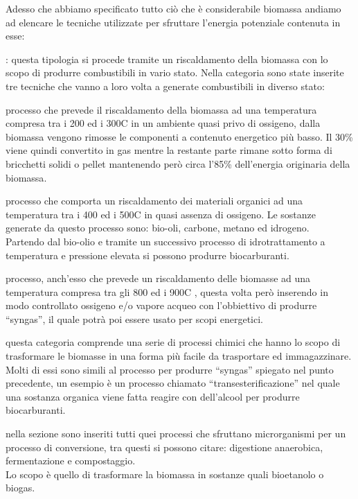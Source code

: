 \vspace{2mm}
Adesso che abbiamo specificato tutto ciò che è considerabile biomassa andiamo ad elencare le tecniche utilizzate per sfruttare l'energia potenziale contenuta in esse\cite{EIA2022}:
\begin{description}[labelindent=5mm]
    \item[$\bullet$ Conversione termica]: questa tipologia si procede tramite un riscaldamento della biomassa con lo scopo di produrre combustibili in vario stato. Nella categoria sono state inserite tre tecniche che vanno a loro volta a generate combustibili in diverso stato:
    \begin{description}[labelindent=5mm]
        \item[$\cdot$ Torrefazione:] processo che prevede il riscaldamento della biomassa ad una temperatura compresa tra i 200 ed i 300\degree C in un ambiente quasi privo di ossigeno, dalla biomassa vengono rimosse le componenti a contenuto energetico più basso. Il 30\% viene quindi convertito in gas mentre la restante parte rimane sotto forma di bricchetti solidi o pellet mantenendo però circa l'85\% dell'energia originaria della biomassa\cite{Torrification}. 
        \item[$\cdot$ Pirolisi:] processo che comporta un riscaldamento dei materiali organici ad una temperatura tra i 400 ed i 500\degree C in quasi assenza di ossigeno. Le sostanze generate da questo processo sono: bio-oli, carbone, metano ed idrogeno.\\
        Partendo dal bio-olio e tramite un successivo processo di idrotrattamento a temperatura e pressione elevata si possono produrre biocarburanti\cite{EIA2021}.
        \item[$\cdot$ Gassificazione:] processo, anch'esso che prevede un riscaldamento delle biomasse ad una temperatura compresa tra gli 800 ed i 900\degree C , questa volta però inserendo in modo controllato ossigeno e/o vapore acqueo con l'obbiettivo di produrre \enquote{syngas}, il quale potrà poi essere usato per scopi energetici.\cite{EIA2022}
    \end{description}
    \item[$\bullet$ Conversione chimica] questa categoria comprende una serie di processi chimici che hanno lo scopo di trasformare le biomasse in una forma più facile da trasportare ed immagazzinare.\\
    Molti di essi sono simili al processo per produrre \enquote{syngas} spiegato nel punto precedente, un esempio è un processo chiamato \enquote{transesterificazione} nel quale una sostanza organica viene fatta reagire con dell'alcool per produrre biocarburanti.\cite{EIA2022}
    \item[$\bullet$ Conversione biologica] nella sezione sono inseriti tutti quei processi che sfruttano microrganismi per un processo di conversione, tra questi si possono citare: digestione anaerobica, fermentazione e compostaggio.\\ Lo scopo è quello di trasformare la biomassa in sostanze quali bioetanolo o biogas. 
\end{description}

